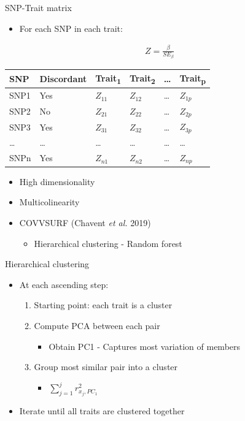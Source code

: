 \documentclass[presentation]{beamer}
\begin{document}
\begin{frame}[label={sec:org0bf5a98}]{SNP-Trait matrix}
\begin{itemize}
\item For each SNP in each trait:
\end{itemize}
\begin{align*}
Z = \frac{\beta}{SE_{\beta}}
\end{align*}

\begin{center}
\begin{tabular}{llllll}
SNP & \alert{Discordant} & Trait\textsubscript{1} & Trait\textsubscript{2} & \ldots{} & Trait\textsubscript{p}\\
\hline
SNP1 & Yes & \(Z_{11}\) & \(Z_{12}\) & \ldots{} & \(Z_{1p}\)\\
SNP2 & No & \(Z_{21}\) & \(Z_{22}\) & \ldots{} & \(Z_{2p}\)\\
SNP3 & Yes & \(Z_{31}\) & \(Z_{32}\) & \ldots{} & \(Z_{3p}\)\\
\ldots{} & \ldots{} & \ldots{} & \ldots{} & \ldots{} & \ldots{}\\
SNPn & Yes & \(Z_{n1}\) & \(Z_{n2}\) & \ldots{} & \(Z_{np}\)\\
\end{tabular}
\end{center}

\begin{itemize}
\item High dimensionality
\item Multicolinearity
\item COVVSURF (Chavent \emph{et al.} 2019)
\begin{itemize}
\item Hierarchical clustering - Random forest
\end{itemize}
\end{itemize}
\end{frame}

\begin{frame}[label={sec:orgbbbedc0}]{Hierarchical clustering}
\begin{itemize}
\item At each ascending step:
\begin{enumerate}
\item Starting point: each trait is a cluster
\item Compute PCA between each pair
\begin{itemize}
\item Obtain PC1 - Captures most variation of members
\end{itemize}
\item Group most similar pair into a cluster
\begin{itemize}
\item \(\sum_{j=1}^j r^2_{x_j, PC_1}\)
\end{itemize}
\end{enumerate}
\item Iterate until all traits are clustered together
\end{itemize}
\end{frame}
\end{document}
